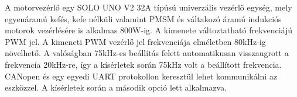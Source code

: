 A motorvezérlő egy SOLO UNO V2 32A típúsú univerzális vezérlő egység, mely egyenáramú kefés, kefe 
nélküli valamint PMSM és váltakozó áramú indukciós motorok vezérlésére is alkalmas 800W-ig. 
A kimenete változtatható frekvenciájú PWM jel. A kimeneti PWM vezérlő jel frekvenciája elméletben 80kHz-ig 
növelhető. A valóságban 75kHz-es beállítás felett automatikusan visszaugrott a frekvencia 20kHz-re, így 
a kísérletek során 75kHz volt a beállított frekvencia. CANopen és egy egyedi UART 
protokollon keresztül lehet kommunikálni az eszközzel. A kísérletek során a második opció lett alkalmazva.


